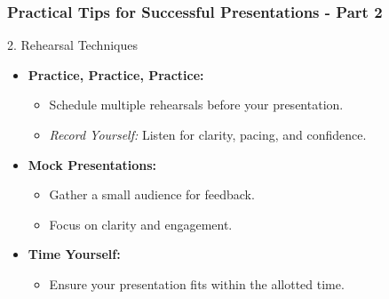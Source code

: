 \documentclass[aspectratio=169]{beamer}
\begin{document}
\begin{frame}[fragile]
    \frametitle{Practical Tips for Successful Presentations - Part 2}
    \begin{block}{2. Rehearsal Techniques}
        \begin{itemize}
            \item \textbf{Practice, Practice, Practice:}
            \begin{itemize}
                \item Schedule multiple rehearsals before your presentation.
                \item \textit{Record Yourself:} Listen for clarity, pacing, and confidence.
            \end{itemize}
            
            \item \textbf{Mock Presentations:}
            \begin{itemize}
                \item Gather a small audience for feedback.
                \item Focus on clarity and engagement.
            \end{itemize}
            
            \item \textbf{Time Yourself:}
            \begin{itemize}
                \item Ensure your presentation fits within the allotted time.
            \end{itemize}
        \end{itemize}
    \end{block}
\end{frame}
\end{document}
